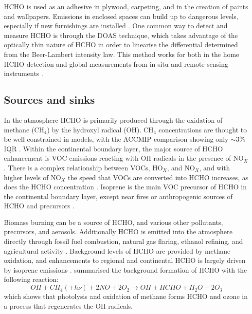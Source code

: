     HCHO is used as an adhesive in plywood, carpeting, and in the creation of paints and wallpapers.
    Emissions in enclosed spaces can build up to dangerous levels, especially if new furnishings are installed \citep{Davenport2015}.
    One common way to detect and measure HCHO is through the DOAS technique, which takes advantage of the optically thin nature of HCHO in order to linearise the differential determined from the Beer-Lambert intensity law.
    This method works for both in the home HCHO detection and global measurements from in-situ and remote sensing instruments \citep{Guenther1995, Abad2015, Davenport2015}.
    
  \subsection{Sources and sinks}
    In the atmosphere HCHO is primarily produced through the oxidation of methane (CH$_4$) by the hydroxyl radical (OH).
    CH$_4$ concentrations are thought to be well constrained in models, with the ACCMIP comparison showing only $\sim3$\% IQR \citep{Young2013}.
    Within the continental boundary layer, the major source of HCHO enhancement is VOC emissions reacting with OH radicals in the presence of NO$_X$ \citep{Wagner2002, Millet2006}.
    There is a complex relationship between VOCs, HO$_X$, and NO$_X$, and with higher levels of NO$_X$ the speed that VOCs are converted into HCHO increases, as does the HCHO concentration \citep{Wolfe2016}.
    Isoprene is the main VOC precursor of HCHO in the continental boundary layer, except near fires or anthropogenic sources of HCHO and precursors \citep{Guenther1995, Wolfe2016}.
    
    Biomass burning can be a source of HCHO, and various other pollutants, precursors, and aerosols.
    Additionally HCHO is emitted into the atmosphere directly through fossil fuel combustion, natural gas flaring, ethanol refining, and agricultural activity \citep{Wolfe2016}.
    Background levels of HCHO are provided by methane oxidation, and enhancements to regional and continental HCHO is largely driven by isoprene emissions \citep{Guenther1995, Palmer2003, Shim2005}.
    \citet{Atkinson2000} summarised the background formation of HCHO with the following reaction:
    \begin{equation} \label{ch_LitRev:eqn:MethaneBackground}
      OH + CH_4 (+ h\nu) + 2NO + 2O_2 \rightarrow OH + HCHO + H_2O + 2O_3
    \end{equation}
    which shows that photolysis and oxidation of methane forms HCHO and ozone in a process that regenerates the OH radicals.
    
